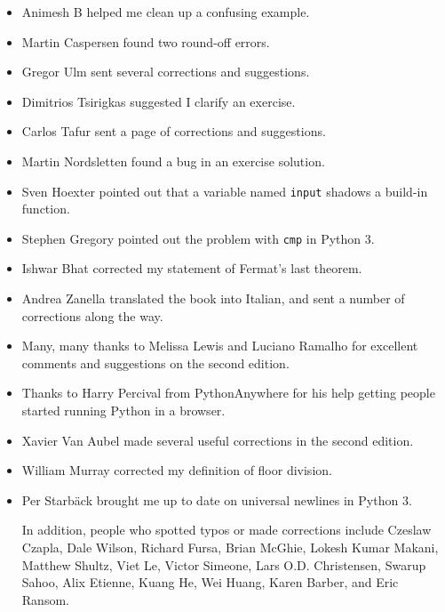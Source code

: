 \documentclass[10pt]{book}
\begin{document}
\begin{itemize}
\item Animesh B helped me clean up a confusing example.

\item Martin Caspersen found two round-off errors.

\item Gregor Ulm sent several corrections and suggestions.

\item Dimitrios Tsirigkas suggested I clarify an exercise.

\item Carlos Tafur sent a page of corrections and suggestions.

\item Martin Nordsletten found a bug in an exercise solution.

\item Sven Hoexter pointed out that a variable named {\tt input}
shadows a build-in function.

\item Stephen Gregory pointed out the problem with {\tt cmp}
in Python 3.

\item Ishwar Bhat corrected my statement of Fermat's last theorem.

\item Andrea Zanella translated the book into Italian, and sent a
number of corrections along the way.

\item Many, many thanks to Melissa Lewis and Luciano Ramalho for
  excellent comments and suggestions on the second edition.

\item Thanks to Harry Percival from PythonAnywhere for his help
getting people started running Python in a browser.

\item Xavier Van Aubel made several useful corrections in the second
edition.

\item William Murray corrected my definition of floor division.

\item Per Starb{\"a}ck brought me up to date on universal newlines in Python 3. 


In addition, people who spotted typos or made corrections include
Czeslaw Czapla, Dale Wilson,
Richard Fursa, Brian McGhie, Lokesh Kumar Makani, Matthew Shultz, Viet
Le, Victor Simeone, Lars O.D. Christensen, Swarup Sahoo, Alix Etienne,
Kuang He, Wei Huang, Karen Barber, and Eric Ransom.




\end{itemize}
\end{document}
